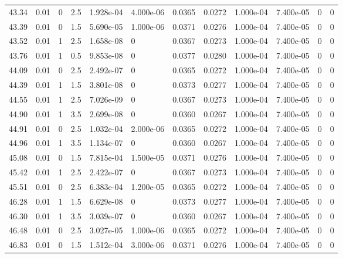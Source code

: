 \documentclass[preview]{standalone}
\begin{document}
{{{{{\begin{tabular}{L{1.2cm}C{1.2cm} C{0.3cm}C{0.5cm} C{1.4cm}C{1.4cm} C{1.4cm}C{1.4cm} C{1.6cm}C{1.6cm} C{1.6cm}C{1.6cm}}
  43.34  &  0.01  & 0     & 2.5 &  1.928e-04  & 4.000e-06  &  0.0365&   0.0272& 1.000e-04 & 7.400e-05   &  0 & 0  \\ 
  43.39  &  0.01  & 0     & 1.5 &  5.690e-05  & 1.000e-06  &  0.0371&   0.0276& 1.000e-04 & 7.400e-05   &  0 & 0  \\ 
  43.52  &  0.01  & 1     & 2.5 &  1.658e-08  & 0  &  0.0367&   0.0273& 1.000e-04 & 7.400e-05   &  0 & 0  \\ 
  43.76  &  0.01  & 1     & 0.5 &  9.853e-08  & 0  &  0.0377&   0.0280& 1.000e-04 & 7.400e-05   &  0 & 0  \\ 
  44.09  &  0.01  & 0     & 2.5 &  2.492e-07  & 0  &  0.0365&   0.0272& 1.000e-04 & 7.400e-05   &  0 & 0  \\ 
  44.39  &  0.01  & 1     & 1.5 &  3.801e-08  & 0  &  0.0373&   0.0277& 1.000e-04 & 7.400e-05   &  0 & 0  \\ 
  44.55  &  0.01  & 1     & 2.5 &  7.026e-09  & 0  &  0.0367&   0.0273& 1.000e-04 & 7.400e-05   &  0 & 0  \\ 
  44.90  &  0.01  & 1     & 3.5 &  2.699e-08  & 0  &  0.0360&   0.0267& 1.000e-04 & 7.400e-05   &  0 & 0  \\ 
  44.91  &  0.01  & 0     & 2.5 &  1.032e-04  & 2.000e-06  &  0.0365&   0.0272& 1.000e-04 & 7.400e-05   &  0 & 0  \\ 
  44.96  &  0.01  & 1     & 3.5 &  1.134e-07  & 0  &  0.0360&   0.0267& 1.000e-04 & 7.400e-05   &  0 & 0  \\ 
  45.08  &  0.01  & 0     & 1.5 &  7.815e-04  & 1.500e-05  &  0.0371&   0.0276& 1.000e-04 & 7.400e-05   &  0 & 0  \\ 
  45.42  &  0.01  & 1     & 2.5 &  2.422e-07  & 0  &  0.0367&   0.0273& 1.000e-04 & 7.400e-05   &  0 & 0  \\ 
  45.51  &  0.01  & 0     & 2.5 &  6.383e-04  & 1.200e-05  &  0.0365&   0.0272& 1.000e-04 & 7.400e-05   &  0 & 0  \\ 
  46.28  &  0.01  & 1     & 1.5 &  6.629e-08  & 0  &  0.0373&   0.0277& 1.000e-04 & 7.400e-05   &  0 & 0  \\ 
  46.30  &  0.01  & 1     & 3.5 &  3.039e-07  & 0  &  0.0360&   0.0267& 1.000e-04 & 7.400e-05   &  0 & 0  \\ 
  46.48  &  0.01  & 0     & 2.5 &  3.027e-05  & 1.000e-06  &  0.0365&   0.0272& 1.000e-04 & 7.400e-05   &  0 & 0  \\ 
  46.83  &  0.01  & 0     & 1.5 &  1.512e-04  & 3.000e-06  &  0.0371&   0.0276& 1.000e-04 & 7.400e-05   &  0 & 0  \\ 

\end{tabular}}}}}}
\end{document}
